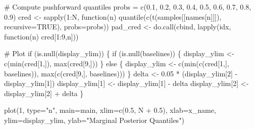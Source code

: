 \documentclass[
  letterpaper,
  DIV=11,
  numbers=noendperiod]{scrartcl}
\newenvironment{Shaded}{\begin{snugshade}}{\end{snugshade}}
\newcommand{\AttributeTok}[1]{\textcolor[rgb]{0.40,0.45,0.13}{#1}}
\newcommand{\CommentTok}[1]{\textcolor[rgb]{0.37,0.37,0.37}{#1}}
\newcommand{\ConstantTok}[1]{\textcolor[rgb]{0.56,0.35,0.01}{#1}}
\newcommand{\ControlFlowTok}[1]{\textcolor[rgb]{0.00,0.23,0.31}{#1}}
\newcommand{\DecValTok}[1]{\textcolor[rgb]{0.68,0.00,0.00}{#1}}
\newcommand{\FloatTok}[1]{\textcolor[rgb]{0.68,0.00,0.00}{#1}}
\newcommand{\FunctionTok}[1]{\textcolor[rgb]{0.28,0.35,0.67}{#1}}
\newcommand{\NormalTok}[1]{\textcolor[rgb]{0.00,0.23,0.31}{#1}}
\newcommand{\OtherTok}[1]{\textcolor[rgb]{0.00,0.23,0.31}{#1}}
\newcommand{\SpecialCharTok}[1]{\textcolor[rgb]{0.37,0.37,0.37}{#1}}
\newcommand{\StringTok}[1]{\textcolor[rgb]{0.13,0.47,0.30}{#1}}
\begin{document}
\begin{Shaded}
\begin{Highlighting}[]
  \CommentTok{\# Compute pushforward quantiles}
\NormalTok{  probs }\OtherTok{=} \FunctionTok{c}\NormalTok{(}\FloatTok{0.1}\NormalTok{, }\FloatTok{0.2}\NormalTok{, }\FloatTok{0.3}\NormalTok{, }\FloatTok{0.4}\NormalTok{, }\FloatTok{0.5}\NormalTok{, }\FloatTok{0.6}\NormalTok{, }\FloatTok{0.7}\NormalTok{, }\FloatTok{0.8}\NormalTok{, }\FloatTok{0.9}\NormalTok{)}
\NormalTok{  cred }\OtherTok{\textless{}{-}} \FunctionTok{sapply}\NormalTok{(}\DecValTok{1}\SpecialCharTok{:}\NormalTok{N, }\ControlFlowTok{function}\NormalTok{(n) }\FunctionTok{quantile}\NormalTok{(}\FunctionTok{c}\NormalTok{(}\FunctionTok{t}\NormalTok{(samples[[names[n]]]),}
                                             \AttributeTok{recursive=}\ConstantTok{TRUE}\NormalTok{),}
                                           \AttributeTok{probs=}\NormalTok{probs))}
\NormalTok{  pad\_cred }\OtherTok{\textless{}{-}} \FunctionTok{do.call}\NormalTok{(cbind, }\FunctionTok{lapply}\NormalTok{(idx, }\ControlFlowTok{function}\NormalTok{(n) cred[}\DecValTok{1}\SpecialCharTok{:}\DecValTok{9}\NormalTok{,n]))}

  \CommentTok{\# Plot}
  \ControlFlowTok{if}\NormalTok{ (}\FunctionTok{is.null}\NormalTok{(display\_ylim)) \{}
    \ControlFlowTok{if}\NormalTok{ (}\FunctionTok{is.null}\NormalTok{(baselines)) \{}
\NormalTok{      display\_ylim }\OtherTok{\textless{}{-}} \FunctionTok{c}\NormalTok{(}\FunctionTok{min}\NormalTok{(cred[}\DecValTok{1}\NormalTok{,]), }\FunctionTok{max}\NormalTok{(cred[}\DecValTok{9}\NormalTok{,]))}
\NormalTok{    \} }\ControlFlowTok{else}\NormalTok{ \{}
\NormalTok{      display\_ylim }\OtherTok{\textless{}{-}} \FunctionTok{c}\NormalTok{(}\FunctionTok{min}\NormalTok{(}\FunctionTok{c}\NormalTok{(cred[}\DecValTok{1}\NormalTok{,], baselines)),}
                        \FunctionTok{max}\NormalTok{(}\FunctionTok{c}\NormalTok{(cred[}\DecValTok{9}\NormalTok{,], baselines)))}
\NormalTok{    \}}
\NormalTok{    delta }\OtherTok{\textless{}{-}} \FloatTok{0.05} \SpecialCharTok{*}\NormalTok{ (display\_ylim[}\DecValTok{2}\NormalTok{] }\SpecialCharTok{{-}}\NormalTok{ display\_ylim[}\DecValTok{1}\NormalTok{])}
\NormalTok{    display\_ylim[}\DecValTok{1}\NormalTok{] }\OtherTok{\textless{}{-}}\NormalTok{ display\_ylim[}\DecValTok{1}\NormalTok{] }\SpecialCharTok{{-}}\NormalTok{ delta}
\NormalTok{    display\_ylim[}\DecValTok{2}\NormalTok{] }\OtherTok{\textless{}{-}}\NormalTok{ display\_ylim[}\DecValTok{2}\NormalTok{] }\SpecialCharTok{+}\NormalTok{ delta}
\NormalTok{  \}}

  \FunctionTok{plot}\NormalTok{(}\DecValTok{1}\NormalTok{, }\AttributeTok{type=}\StringTok{"n"}\NormalTok{, }\AttributeTok{main=}\NormalTok{main,}
       \AttributeTok{xlim=}\FunctionTok{c}\NormalTok{(}\FloatTok{0.5}\NormalTok{, N }\SpecialCharTok{+} \FloatTok{0.5}\NormalTok{), }\AttributeTok{xlab=}\NormalTok{x\_name,}
       \AttributeTok{ylim=}\NormalTok{display\_ylim, }\AttributeTok{ylab=}\StringTok{"Marginal Posterior Quantiles"}\NormalTok{)}


\end{Highlighting}
\end{Shaded}
\end{document}
